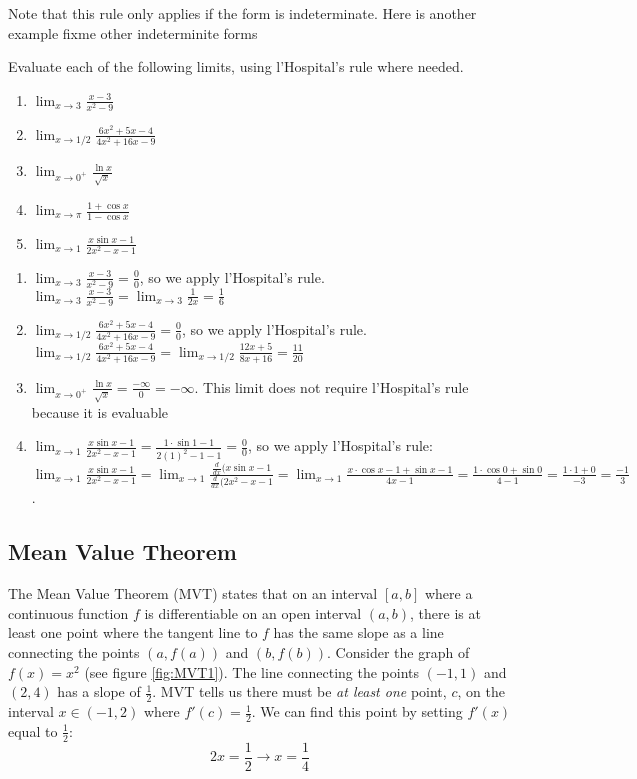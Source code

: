 Note that this rule only applies if the form is indeterminate. Here is another example
fixme other indeterminite forms
\begin{Exercise}[label = LH2]
Evaluate each of the following limits, using l'Hospital's rule where needed.
\begin{enumerate}
\item $\lim_{x \to 3} \frac{x-3}{x^2-9}$
\item $\lim_{x \to 1/2} \frac{6x^2 + 5x - 4}{4x^2 + 16x - 9}$
\item $\lim_{x \to 0^+} \frac{\ln{x}}{\sqrt{x}}$
\item $\lim_{x \to \pi} \frac{1 + \cos{x}}{1 - \cos{x}}$
\item $\lim_{x \to 1} \frac{x\sin{x - 1}}{2x^2 - x - 1}$
\end{enumerate}
\end{Exercise}

\begin{Answer}[ref=LH2]
\begin{enumerate}
\item $\lim_{x \to 3} \frac{x-3}{x^2-9} = \frac{0}{0}$, so we apply l'Hospital's rule. $\lim_{x \to 3} \frac{x-3}{x^2-9} = \lim_{x \to 3} \frac{1}{2x} = \frac{1}{6}$
\item $\lim_{x \to 1/2} \frac{6x^2 + 5x - 4}{4x^2 + 16x - 9} = \frac{0}{0}$, so we apply l'Hospital's rule. $\lim_{x \to 1/2} \frac{6x^2 + 5x - 4}{4x^2 + 16x - 9} = \lim_{x \to 1/2} \frac{12x + 5}{8x + 16} = \frac{11}{20}$
\item $\lim_{x \to 0^+} \frac{\ln{x}}{\sqrt{x}} = \frac{-\infty}{0} = -\infty$. This limit does not require l'Hospital's rule because it is evaluable
\item $\lim_{x \to 1} \frac{x\sin{x - 1}}{2x^2 - x - 1} = \frac{1 \cdot \sin{1 - 1}}{2(1)^2 - 1 - 1} = \frac{0}{0}$, so we apply l'Hospital's rule: $\lim_{x \to 1} \frac{x\sin{x - 1}}{2x^2 - x - 1} = \lim_{x \to 1} \frac{\frac{d}{dx}(x\sin{x-1}}{\frac{d}{dx}(2x^2 - x - 1} = \lim_{x \to 1} \frac{x \cdot \cos{x - 1} + \sin{x - 1}}{4x - 1} = \frac{1 \cdot \cos{0} + \sin{0}}{4 - 1} = \frac{1 \cdot 1 + 0}{-3} = \frac{-1}{3}$. 
\end{enumerate}
\end{Answer}

\subsection{Mean Value Theorem}

The Mean Value Theorem (MVT) states that on an interval $[a, b]$ where a 
continuous function $f$ is differentiable on an open interval $(a, b)$, there 
is at least one point where the tangent line to $f$ has the same slope as a 
line connecting the points $(a, f(a))$ and $(b, f(b))$. Consider the graph of 
$f(x) = x^2$ (see figure \ref{fig:MVT1}). The line connecting the points 
$(-1, 1)$ and $(2, 4)$ has a slope of $\frac{1}{2}$. MVT tells us there must 
be \textit{at least one} point, $c$, on the interval $x \in (-1, 2)$ where 
$f'(c) = \frac{1}{2}$. We can find this point by setting $f'(x)$ equal to 
$\frac{1}{2}$: 
$$2x = \frac{1}{2} \rightarrow x = \frac{1}{4}$$

